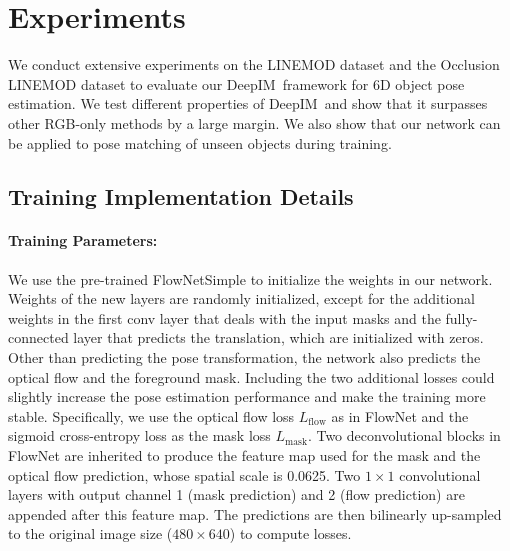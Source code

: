 \documentclass[twocolumn]{svjour3}
\newcommand{\dimnet}[0]{DeepIM}
\begin{document}
\section{Experiments}

We conduct extensive experiments on the LINEMOD dataset \citep{hinterstoisser2012accv} and the Occlusion LINEMOD dataset \citep{Brachmann2014Learning6O} to evaluate our \dimnet\ framework for 6D object pose estimation. We test different properties of \dimnet\ and show that it surpasses other RGB-only methods by a large margin. We also show that our network can be applied to pose matching of unseen objects during training.

\subsection{Training Implementation Details}
\label{sec.training_details}


\paragraph{Training Parameters:} 
We use the pre-trained FlowNetSimple \citep{dosovitskiy2015flownet} to initialize the weights in our network. Weights of the new layers are randomly initialized, except for the additional weights in the first conv layer that deals with the input masks and the fully-connected layer that predicts the translation, which are initialized with zeros. Other than predicting the pose transformation, the network also predicts the optical flow and the foreground mask. Including the two additional losses could slightly increase the pose estimation performance and make the training more stable. Specifically, we use the optical flow loss $L_\text{flow}$ as in FlowNet \citep{dosovitskiy2015flownet} and the sigmoid cross-entropy loss as the mask loss $L_\text{mask}$. Two deconvolutional blocks in FlowNet are inherited to produce the feature map used for the mask and the optical flow prediction, whose spatial scale is 0.0625. Two $1\times 1$ convolutional layers with output channel 1 (mask prediction) and 2 (flow prediction) are appended after this feature map. The predictions are then bilinearly up-sampled to the original image size ($480\times 640$) to compute losses. 
\end{document}
